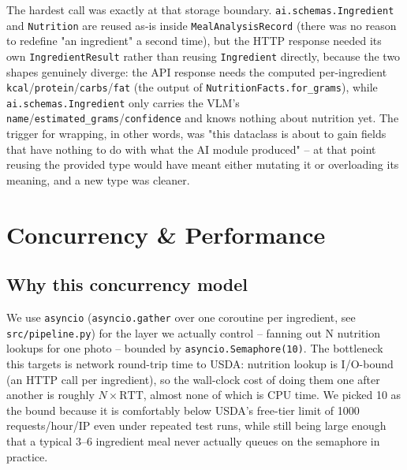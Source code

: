 \documentclass[11pt,a4paper]{article}
\begin{document}
The hardest call was exactly at that storage boundary. \texttt{ai.schemas.Ingredient} and \texttt{Nutrition} are reused as-is inside \texttt{MealAnalysisRecord} (there was no reason to redefine "an ingredient" a second time), but the HTTP response needed its own \texttt{IngredientResult} rather than reusing \texttt{Ingredient} directly, because the two shapes genuinely diverge: the API response needs the computed per-ingredient \texttt{kcal}/\texttt{protein}/\texttt{carbs}/\texttt{fat} (the output of \texttt{NutritionFacts.for\_grams}), while \texttt{ai.schemas.Ingredient} only carries the VLM's \texttt{name}/\texttt{estimated\_grams}/\texttt{confidence} and knows nothing about nutrition yet. The trigger for wrapping, in other words, was "this dataclass is about to gain fields that have nothing to do with what the AI module produced" -- at that point reusing the provided type would have meant either mutating it or overloading its meaning, and a new type was cleaner.

\section{Concurrency \& Performance}\label{sec:concurrency}

\subsection{Why this concurrency model}

We use \texttt{asyncio} (\texttt{asyncio.gather} over one coroutine per ingredient, see \texttt{src/pipeline.py}) for the layer we actually control -- fanning out N nutrition lookups for one photo -- bounded by \texttt{asyncio.Semaphore(10)}. The bottleneck this targets is network round-trip time to USDA: nutrition lookup is I/O-bound (an HTTP call per ingredient), so the wall-clock cost of doing them one after another is roughly $N \times \text{RTT}$, almost none of which is CPU time. We picked 10 as the bound because it is comfortably below USDA's free-tier limit of 1000 requests/hour/IP even under repeated test runs, while still being large enough that a typical 3--6 ingredient meal never actually queues on the semaphore in practice.
\end{document}
